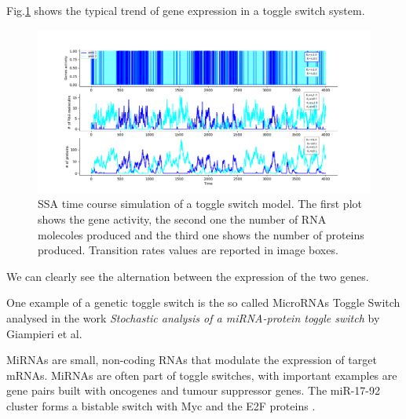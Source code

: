 \documentclass[12pt,a4paper]{report}
\begin{document}
Fig.\ref{toggleswitchtimeplot} shows the typical trend of gene expression in a toggle switch system.

\begin{figure}[!ht]
\hspace*{-2.5cm} 
\includegraphics[scale=0.59]{toggleswitchtimeplot.png}
\caption{SSA time course simulation of a toggle switch model. The first plot shows the gene activity, the second one the number of RNA molecoles produced and the third one shows the number of proteins produced. Transition rates values are reported in image boxes.}
\label{toggleswitchtimeplot}
\end{figure}
\newpage
We can clearly see the alternation between the expression of the two genes.

One example of a genetic toggle switch is the so called MicroRNAs Toggle Switch analysed in the work \emph{
Stochastic analysis of a miRNA-protein toggle switch} \cite{microRNAs} by Giampieri et al.  

MiRNAs are small, non-coding RNAs
that modulate the expression of target mRNAs. MiRNAs are often part of toggle switches, with important examples
are gene pairs built with oncogenes and tumour suppressor genes. The miR-17-92
cluster forms a bistable switch with Myc and the E2F proteins \cite{microRNAs}.





\end{document}
